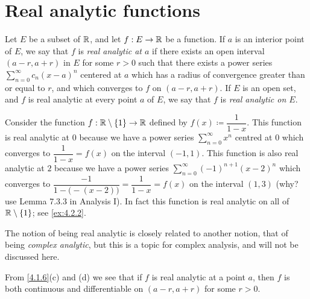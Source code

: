 \section{Real analytic functions}\label{sec:4.2}

\begin{defn}\label{4.2.1}
  Let \(E\) be a subset of \(\mathbb{R}\), and let \(f : E \to \mathbb{R}\) be a function.
  If \(a\) is an interior point of \(E\), we say that \(f\) is \emph{real analytic at \(a\)} if there exists an open interval \((a - r, a + r)\) in \(E\) for some \(r > 0\) such that there exists a power series \(\sum_{n = 0}^\infty c_n (x - a)^n\) centered at \(a\) which has a radius of convergence greater than or equal to \(r\), and which converges to \(f\) on \((a - r, a + r)\).
  If \(E\) is an open set, and \(f\) is real analytic at every point \(a\) of \(E\), we say that \(f\) is \emph{real analytic on \(E\)}.
\end{defn}

\begin{eg}\label{4.2.2}
  Consider the function \(f : \mathbb{R} \setminus \left\lbrace1\right\rbrace \to \mathbb{R}\) defined by \(f(x) \coloneqq \dfrac{1}{1 - x}\).
  This function is real analytic at \(0\) because we have a power series \(\sum_{n = 0}^\infty x^n\) centred at \(0\) which converges to \(\dfrac{1}{1 - x} = f(x)\) on the interval \((-1, 1)\).
  This function is also real analytic at \(2\) because we have a power series \(\sum_{n = 0}^\infty (-1)^{n + 1} (x - 2)^n\) which converges to \(\dfrac{-1}{1 - \big(-(x - 2)\big)} = \dfrac{1}{1 - x} = f(x)\) on the interval \((1, 3)\)
  (why? use Lemma 7.3.3 in Analysis I).
  In fact this function is real analytic on all of \(\mathbb{R} \setminus \left\lbrace1\right\rbrace\);
  see \cref{ex:4.2.2}.
\end{eg}

\begin{rmk}\label{4.2.3}
  The notion of being real analytic is closely related to another notion, that of being \emph{complex analytic}, but this is a topic for complex analysis, and will not be discussed here.
\end{rmk}

\begin{note}
  From \cref{4.1.6}(c) and (d) we see that if \(f\) is real analytic at a point \(a\), then \(f\) is both continuous and diﬀerentiable on \((a - r, a + r)\) for some \(r > 0\).
\end{note}

